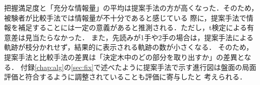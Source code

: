 把握満足度と「充分な情報量」の平均は提案手法の方が高くなった．そのため，被験者が比較手法では情報量が不十分であると感じている
際に，提案手法で情報を補足することには一定の意義があると推測される．ただし，t検定による有意差は見当たらなかった．
また，先読みが1手や2手の場合は，提案手法による軌跡が枝分かれせず，結果的に表示される軌跡の数が小さくなる．
そのため，提案手法と比較手法の差異は「決定木中のどの部分を取り出すか」の差異となる．
付録\ref{chap:alg}の\ref{sec:fix}で述べたように提案手法で示す進行図は盤面の局面評価と符合するように調整されていることも評価に寄与したと
考えられる．